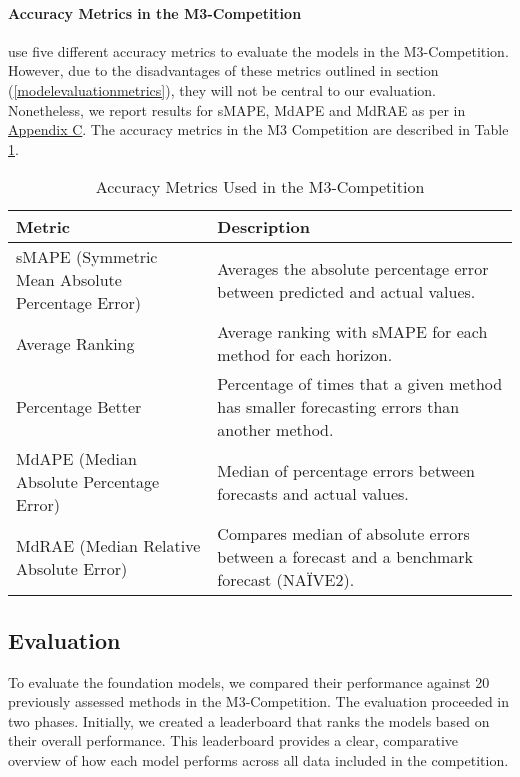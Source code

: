\documentclass[12pt,a4paper]{article}
\begin{document}
\paragraph{Accuracy Metrics in the M3-Competition}

\cite{MAKRIDAKIS2000} use five different accuracy metrics to evaluate the models in the M3-Competition. However, due to the disadvantages of these metrics outlined in section (\ref{modelevaluationmetrics}), they will not be central to our evaluation. Nonetheless, we report results for sMAPE, MdAPE and MdRAE as per \cite{MAKRIDAKIS2000} in \hyperref[appendix_c]{Appendix C}. The accuracy metrics in the M3 Competition are described in Table \ref{forecasting_metrics_m3}. 

\begin{table}[htbp]
  \centering
  \caption{Accuracy Metrics Used in the M3-Competition}
  \label{forecasting_metrics_m3}
  \begin{tabularx}{\textwidth}{lX}  %
  \toprule
  \textbf{Metric}                                           & \textbf{Description} \\
  \midrule
  sMAPE (Symmetric Mean Absolute Percentage Error)          & Averages the absolute percentage error between predicted and actual values. \\
  \hline
  Average Ranking                                           & Average ranking with sMAPE for each method for each horizon. \\
  \hline
  Percentage Better                                         & Percentage of times that a given method has smaller forecasting errors than another method. \\
  \hline
  MdAPE (Median Absolute Percentage Error)                  & Median of percentage errors between forecasts and actual values. \\
  \hline
  MdRAE (Median Relative Absolute Error)                    & Compares median of absolute errors between a forecast and a benchmark forecast (NAÏVE2). \\
  \bottomrule
  \end{tabularx}
\end{table}

\subsection{Evaluation}
To evaluate the foundation models, we compared their performance against 20 previously assessed methods in the M3-Competition. The evaluation proceeded in two phases. Initially, we created a leaderboard that ranks the models based on their overall performance. This leaderboard provides a clear, comparative overview of how each model performs across all data included in the competition.
\end{document}
